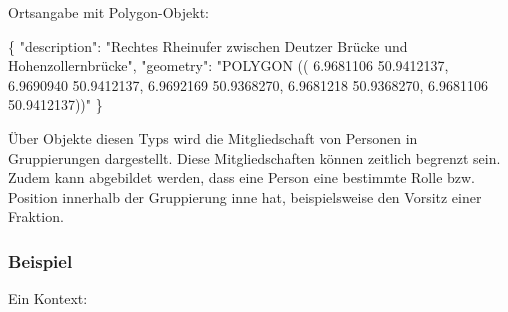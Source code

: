 \documentclass[,a4paper]{article}
\newenvironment{Shaded}{}{}
\newcommand{\DataTypeTok}[1]{\textcolor[rgb]{0.56,0.13,0.00}{{#1}}}
\newcommand{\StringTok}[1]{\textcolor[rgb]{0.25,0.44,0.63}{{#1}}}
\newcommand{\FunctionTok}[1]{\textcolor[rgb]{0.02,0.16,0.49}{{#1}}}
\begin{document}
Ortsangabe mit Polygon-Objekt:

\begin{Shaded}
\begin{Highlighting}[]
\FunctionTok{\{}
    \DataTypeTok{"description"}\FunctionTok{:} \StringTok{"Rechtes Rheinufer zwischen Deutzer}
\StringTok{        Brücke und Hohenzollernbrücke"}\FunctionTok{,}
    \DataTypeTok{"geometry"}\FunctionTok{:} \StringTok{"POLYGON ((}
\StringTok{                6.9681106 50.9412137,}
\StringTok{                6.9690940 50.9412137,}
\StringTok{                6.9692169 50.9368270,}
\StringTok{                6.9681218 50.9368270,}
\StringTok{                6.9681106 50.9412137))"}
\FunctionTok{\}}
\end{Highlighting}
\end{Shaded}


Über Objekte diesen Typs wird die Mitgliedschaft von Personen in
Gruppierungen dargestellt. Diese Mitgliedschaften können zeitlich
begrenzt sein. Zudem kann abgebildet werden, dass eine Person eine
bestimmte Rolle bzw. Position innerhalb der Gruppierung inne hat,
beispielsweise den Vorsitz einer Fraktion.

\subsubsection{Beispiel}\label{beispiel-10}

Ein Kontext:
\end{document}
